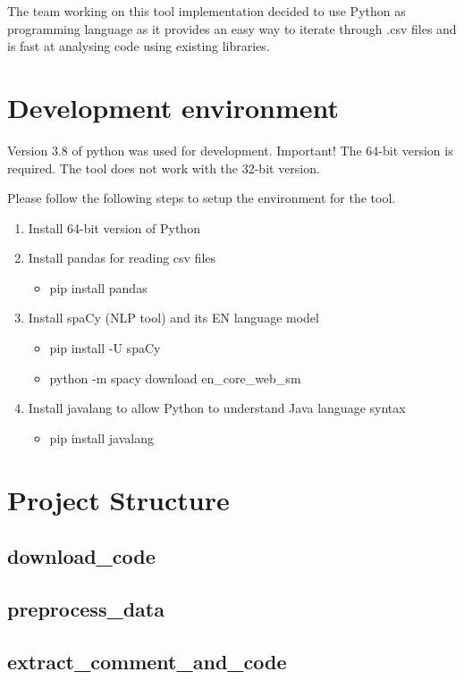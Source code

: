 \documentclass[runningheads]{llncs}
\begin{document}
The team working on this tool implementation decided to use Python as programming language as it provides an easy way to iterate through .csv files and is fast at analysing code using existing libraries.

\section{Development environment}
Version 3.8 of python was used for development. Important! The 64-bit version is required. The tool does not work with the 32-bit version.

Please follow the following steps to setup the environment for the tool.
\begin{enumerate}
\item Install 64-bit version of Python \cite{ref_python}
\item Install pandas for reading csv files
\begin{itemize}\item pip install pandas\end{itemize}
\item Install spaCy (NLP tool) and its EN language model
\begin{itemize}\item pip install -U spaCy
\item python -m spacy download en\_core\_web\_sm
\end{itemize}
\item Install javalang to allow Python to understand Java language syntax
\begin{itemize}\item pip install javalang\end{itemize}
\end{enumerate}



\section{Project Structure}
\subsection{download\_code}
\subsection{preprocess\_data}
\subsection{extract\_comment\_and\_code}
\end{document}
